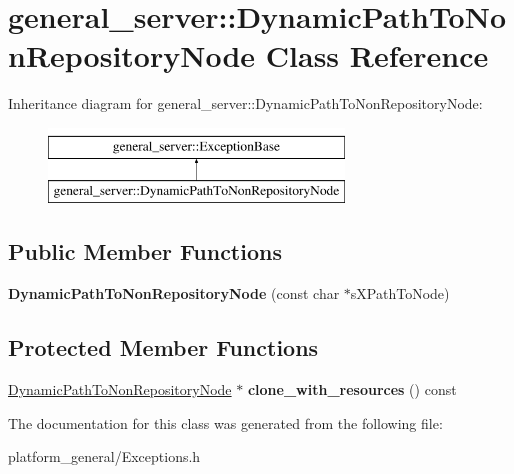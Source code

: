 \hypertarget{classgeneral__server_1_1DynamicPathToNonRepositoryNode}{\section{general\-\_\-server\-:\-:\-Dynamic\-Path\-To\-Non\-Repository\-Node \-Class \-Reference}
\label{classgeneral__server_1_1DynamicPathToNonRepositoryNode}
}
\-Inheritance diagram for general\-\_\-server\-:\-:\-Dynamic\-Path\-To\-Non\-Repository\-Node\-:\begin{figure}[H]
\begin{center}
\leavevmode
\includegraphics[height=2.000000cm]{classgeneral__server_1_1DynamicPathToNonRepositoryNode}
\end{center}
\end{figure}
\subsection*{\-Public \-Member \-Functions}
\begin{DoxyCompactItemize}
\item 
\hypertarget{classgeneral__server_1_1DynamicPathToNonRepositoryNode_acaa5916a3a6b709536aa2394311b7fb0}{{\bfseries \-Dynamic\-Path\-To\-Non\-Repository\-Node} (const char $\ast$s\-X\-Path\-To\-Node)}\label{classgeneral__server_1_1DynamicPathToNonRepositoryNode_acaa5916a3a6b709536aa2394311b7fb0}

\end{DoxyCompactItemize}
\subsection*{\-Protected \-Member \-Functions}
\begin{DoxyCompactItemize}
\item 
\hypertarget{classgeneral__server_1_1DynamicPathToNonRepositoryNode_ac20789fbddc2032610d7da98d2f7b567}{\hyperlink{classgeneral__server_1_1DynamicPathToNonRepositoryNode}{\-Dynamic\-Path\-To\-Non\-Repository\-Node} $\ast$ {\bfseries clone\-\_\-with\-\_\-resources} () const }\label{classgeneral__server_1_1DynamicPathToNonRepositoryNode_ac20789fbddc2032610d7da98d2f7b567}

\end{DoxyCompactItemize}


\-The documentation for this class was generated from the following file\-:\begin{DoxyCompactItemize}
\item 
platform\-\_\-general/\-Exceptions.\-h\end{DoxyCompactItemize}
